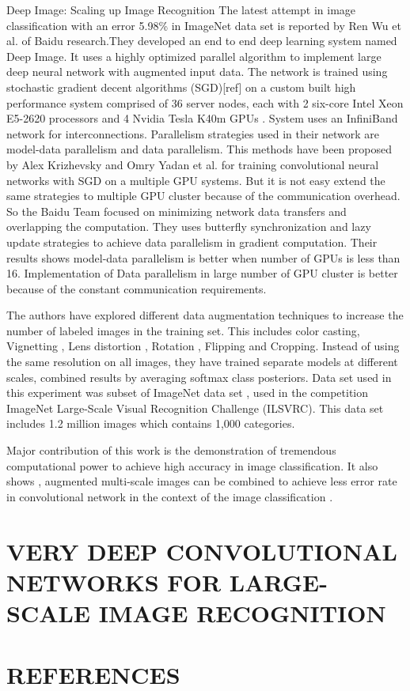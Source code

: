 \documentclass{article}
\begin{document}
\begin{section}{Deep Image: Scaling up Image Recognition}
The latest attempt in image classification with an error 5.98\% in ImageNet data set is reported by  Ren Wu et al.\cite{Wu2015} of Baidu research.They developed an end to end deep learning  system named Deep Image. It uses a highly optimized parallel algorithm  to implement large deep neural network with augmented input data. The network is trained using stochastic gradient decent algorithms (SGD)[ref] on a custom built high performance system comprised of 36 server nodes, each with 2 six-core Intel Xeon E5-2620 processors and 4 Nvidia Tesla K40m GPUs . System  uses an InfiniBand  network for interconnections. Parallelism strategies used in their network are model-data parallelism and data parallelism.  This methods have been proposed by Alex Krizhevsky \cite{Krizhevsky2014} and Omry Yadan et al.\cite{Yadan2013} for training convolutional neural networks with SGD on a  multiple GPU systems. But it is not easy extend the same strategies to multiple GPU cluster because of the communication overhead. So the  Baidu Team focused on minimizing network data transfers and overlapping the computation. They uses butterfly synchronization and lazy update strategies to achieve data parallelism in gradient computation. Their results shows model-data parallelism is better when number of GPUs is less than 16. Implementation of Data parallelism in large number  of GPU  cluster is better because of the constant communication requirements.
\par
The authors have explored different data augmentation techniques to increase the number of labeled images in the training set. This includes color casting, Vignetting , Lens distortion , Rotation , Flipping and  Cropping. Instead of using the same resolution on all images, they have trained separate models at different scales, combined results by averaging softmax class posteriors.
Data set used in this experiment was subset of ImageNet data set , used in the competition ImageNet Large-Scale Visual Recognition Challenge (ILSVRC)\cite{Berg2010}. This data set includes 1.2 million images which contains 1,000 categories.
\par
 Major contribution of this work is the demonstration of tremendous computational power to achieve high accuracy in image classification.
It also shows , augmented multi-scale images can be combined to achieve less error rate in convolutional network in the context of the image classification . 
 \end{section}
\section{VERY DEEP CONVOLUTIONAL NETWORKS FOR LARGE-SCALE IMAGE RECOGNITION}


\section{REFERENCES}
\label{sec:survey}


\end{document}
